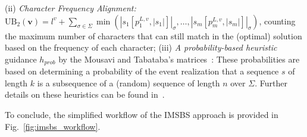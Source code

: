 \documentclass[runningheads]{llncs}
\begin{document}
	(ii)  \textit{Character Frequency Alignment:}
	$\textrm{UB}_2(\mathbf{v}) =  l^v + \sum_{\sigma \in \Sigma} 
	\min\left(  |s_1[p_1^{L, v}, |s_1|]|_{\sigma}, \ldots, |s_m[p_m^{L, v}, |s_m|]|_{\sigma} \right)$,  counting the maximum number of characters that can still match in the (optimal) solution based on the frequency of each character; %
	(iii) \textit{A probability-based heuristic} guidance $h_{prob}$ by the Mousavi and Tabataba's matrices~\cite{mousavi2012improved}:  These probabilities are based on determining a probability of the event realization that a sequence $s$ of length $k$ is a subsequence of a (random) sequence of length $n$ over $\Sigma$.  %
	Further details on these heuristics can be found in~\cite{DJUKANOVIC2020106499,mousavi2012improved}. 
	
	To conclude, the simplified workflow of the IMSBS approach is provided in Fig.~\ref{fig:imsbs_workflow}. 
	
\end{document}
